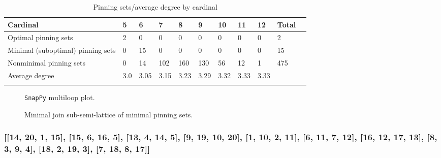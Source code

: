 \documentclass{article}%
\begin{document}
\begin{table}[ht]
	\caption{Pinning sets/average degree by cardinal}
	\centering
	\renewcommand{\arraystretch}{1.5}
	\begin{tabularx}{\textwidth}{lXXXXXXXXXX}
		\toprule
			Cardinal & 5 & 6 & 7 & 8 & 9 & 10 & 11 & 12 & Total\\
			\hline
			Optimal pinning sets & 2 & 0 & 0 & 0 & 0 & 0 & 0 & 0 & 2 \\
			Minimal (suboptimal) pinning sets & 0 & 15 & 0 & 0 & 0 & 0 & 0 & 0 & 15 \\
			Nonminimal pinning sets & 0 & 14 & 102 & 160 & 130 & 56 & 12 & 1 & 475 \\
			Average degree & 3.0 & 3.05 & 3.15 & 3.23 & 3.29 & 3.32 & 3.33 & 3.33 &  \\
		\bottomrule \\ 
	\end{tabularx}
\end{table}

\begin{multicols}{2}
\begin{figure}[H]
\centering

\caption{\texttt{SnapPy} multiloop plot.}
\label{fig:tex/img/[[13, 20, 14, 1], [5, 12, 6, 13], [6, 19, 7, 20], [14, 7, 15, 8], [1, 8, 2, 9], [17, 4, 18, 5], [18, 11, 19, 12], [15, 3, 16, 2], [9, 16, 10, 17], [10, 3, 11, 4]].svg}
\end{figure}
\columnbreak

\begin{figure}[H]
\centering
\scalebox{0.8}{}
\caption{Minimal join sub-semi-lattice of minimal pinning sets.}
\label{fig:tex/img/[[13, 20, 14, 1], [5, 12, 6, 13], [6, 19, 7, 20], [14, 7, 15, 8], [1, 8, 2, 9], [17, 4, 18, 5], [18, 11, 19, 12], [15, 3, 16, 2], [9, 16, 10, 17], [10, 3, 11, 4]].pgf}
\end{figure}
\end{multicols}

\newpage

\subsubsection{[[14, 20, 1, 15], [15, 6, 16, 5], [13, 4, 14, 5], [9, 19, 10, 20], [1, 10, 2, 11], [6, 11, 7, 12], [16, 12, 17, 13], [8, 3, 9, 4], [18, 2, 19, 3], [7, 18, 8, 17]]}
\end{document}
